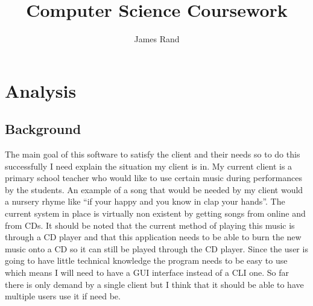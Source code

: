 \documentclass{article}
\title{Computer Science Coursework}
\date{}
\author{James Rand}
\begin{document}
\maketitle
\tableofcontents
\setcounter{tocdepth}{5}
\newpage
\section{Analysis}\label{analysis}
\subsection{Background}\label{background}
The main goal of this software to satisfy the client and their needs so
to do this successfully I need explain the situation my client
is in. My current client is a primary school teacher who would like to
use certain music during performances by the students. An example of a
song that would be needed by my client would a nursery rhyme like ``if
your happy and you know in clap your hands''. The current system in
place is virtually non existent by getting songs from online
and from CDs. It should be noted that the current method of playing this music
is through a CD player and that this application needs to be able to
burn the new music onto a CD so it can still be played through the CD
player.
Since the user is going to have little technical knowledge the program
needs to be easy to use which means I will need to have a GUI interface
instead of a CLI one. So far there is only demand by a single client but
I think that it should be able to have multiple users use it if need be.
\end{document}
